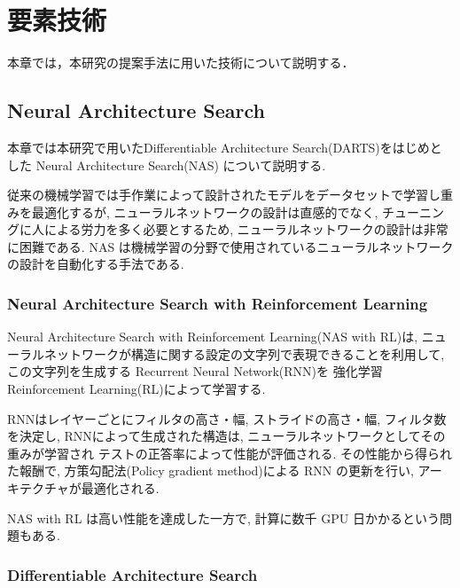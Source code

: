 \newpage
\changeindent{0cm}
\section{要素技術}
\label{sec:tech}
\changeindent{2cm}


本章では，本研究の提案手法に用いた技術について説明する．

\changeindent{0cm}
\subsection{Neural Architecture Search}
\changeindent{2cm}
\label{sec:02_deep}
本章では本研究で用いたDifferentiable Architecture Search(DARTS)をはじめとした
Neural Architecture Search(NAS) について説明する.

従来の機械学習では手作業によって設計されたモデルをデータセットで学習し重みを最適化するが,
ニューラルネットワークの設計は直感的でなく,
チューニングに人による労力を多く必要とするため,
ニューラルネットワークの設計は非常に困難である.
NAS は機械学習の分野で使用されているニューラルネットワークの設計を自動化する手法である.


\changeindent{0cm}
\subsubsection{Neural Architecture Search with Reinforcement Learning}
\changeindent{2cm}
\label{sec:02_nas}
Neural Architecture Search with Reinforcement Learning(NAS with RL)\cite{DBLP:journals/corr/ZophL16}は,
ニューラルネットワークが構造に関する設定の文字列で表現できることを利用して,
この文字列を生成する Recurrent Neural Network(RNN)を
強化学習 Reinforcement Learning(RL)によって学習する.

RNNはレイヤーごとにフィルタの高さ・幅, ストライドの高さ・幅, フィルタ数を決定し,
RNNによって生成された構造は, ニューラルネットワークとしてその重みが学習され
テストの正答率によって性能が評価される.
その性能から得られた報酬で, 方策勾配法(Policy gradient method)による RNN の更新を行い,
アーキテクチャが最適化される.

NAS with RL は高い性能を達成した一方で, 計算に数千 GPU 日かかるという問題もある.

\changeindent{0cm}
\subsubsection{Differentiable Architecture Search}
\changeindent{2cm}
\label{sec:02_darts}

